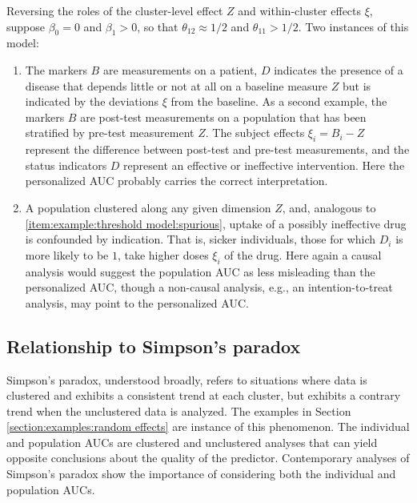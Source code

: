\documentclass[12pt]{article}
\DeclareMathOperator{\AUC}{AUC}
\newcommand{\cind}{\perp \!\!\! \perp}
\newcommand{\aucindiv}{\theta_{11}}%
\newcommand{\aucpop}{\theta_{12}}%
\newcommand{\comment}[1]{
  \iftoggle{commenttoggle}{
    {\normalsize{\color{red}{ #1}}\normalsize}
  }
  {}
}
\begin{document}
Reversing the roles of the cluster-level effect $Z$ and within-cluster
effects $\xi$, suppose $\beta_0=0$ and $\beta_1>0$, so that $\aucpop\approx 1/2$ and
$\aucindiv>1/2$. Two instances of this model:
\begin{enumerate}[resume,label=(\alph*)]
\item  The markers $B$ are measurements on a patient, 
$D$ indicates the presence of
a disease that depends little or not at all on a baseline measure $Z$ but is indicated by the deviations $\xi$ from the
baseline.  As a second example, the markers $B$ are post-test measurements on a population that has been stratified by pre-test measurement $Z$. The subject effects $\xi_i=B_i-Z$ represent the difference between post-test and pre-test measurements, and the status indicators $D$ represent an effective or ineffective intervention.
Here the personalized AUC probably carries the correct interpretation.
\item A population clustered along any given dimension $Z$, and, analogous to \ref{item:example:threshold model:spurious}, uptake of a possibly ineffective drug is confounded by indication. That is, sicker individuals, those for which $D_i$ is more likely to be $1$, take higher doses $\xi_i$ of the drug. Here again a causal analysis would suggest the population AUC as less misleading than the personalized AUC, though a non-causal analysis, e.g., an intention-to-treat analysis, may point to the personalized AUC.
\end{enumerate}

\subsection{Relationship to Simpson's paradox}
Simpson's paradox, understood broadly, refers to situations where data
is clustered and exhibits a consistent trend at each cluster, but
exhibits a contrary trend when the unclustered data is analyzed. The
examples in Section \ref{section:examples:random effects} are instance of this
phenomenon. The individual and population AUCs are clustered and
unclustered analyses that can yield opposite conclusions about the quality
of the predictor. Contemporary analyses of Simpson's paradox show the importance of considering both the individual and population AUCs.
\end{document}
